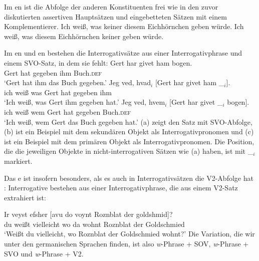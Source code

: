 Im en ist die Abfolge der anderen Konstituenten frei wie in den zuvor diskutierten assertiven Hauptsätzen und eingebetteten
Sätzen mit einem Komplementierer.
\eal
\ex
Ich weiß, was keiner diesem Eichhörnchen geben würde.\german
\ex
Ich weiß, was diesem Eichhörnchen keiner geben würde.
\zl

\noindent
Im en und en bestehen die Interrogativsätze aus einer Interrogativphrase und einem SVO-Satz,
in dem sie fehlt:
\eal
\ex
\gll Gert har givet ham bogen.\\
     Gert hat gegeben ihm Buch.\textsc{def}\\
\glt `Gert hat ihm das Buch gegeben.'
\ex
\gll Jeg ved, hvad$_i$ [Gert har givet ham \_$_i$].\\
     ich weiß was \spacebr{}Gert hat gegeben ihm\\
\glt `Ich weiß, was Gert ihm gegeben hat.'
\ex
\gll Jeg ved, hvem$_i$ [Gert har givet \_$_i$   bogen].\\
     ich weiß wem        \spacebr{}Gert hat gegeben {} Buch.\textsc{def}\\
\glt `Ich weiß, wem Gert das Buch gegeben hat.'
\zl
(a) zeigt den Satz mit SVO-Abfolge, (b) ist ein Beispiel mit dem sekundären Objekt als
Interrogativpronomen und (c) ist ein Beispiel mit dem primären Objekt als
Interrogativpronomen. Die Position, die die jeweiligen Objekte in nicht-interrogativen Sätzen wie (a)
haben, ist mit \_$_i$ markiert.

Das e ist insofern besonders, als es auch in Interrogativsätzen die V2-Abfolge hat \citep[Abschnitte~4.1, 4.2]{Diesing90a}: Interrogative
bestehen aus einer Interrogativphrase, die aus einem V2-Satz extrahiert ist:

\ea
\gll Ir veyst efsher [avu            do    voynt Roznblat   der goldshmid]?\footnotemark\\
     du weißt vielleicht  \spacebr{}wo  da   wohnt Roznblat der Goldschmied\\
\glt `Weißt du vielleicht, wo Roznblat der Goldschmied wohnt?'
\z
%
\noindent
Die Variation, die wir unter den germanischen Sprachen finden, ist also \emph{w}-Phrase + SOV, \emph{w}-Phrase + SVO und \emph{w}-Phrase + V2.

